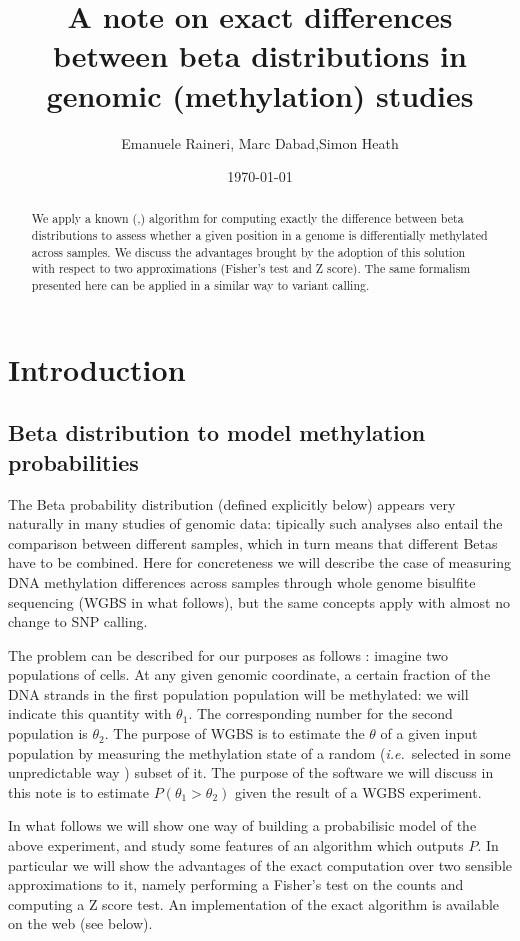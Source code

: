 \documentclass[11pt]{amsart}
\title{A note on exact differences between beta distributions in genomic (methylation) studies}
\author{Emanuele Raineri, Marc Dabad,Simon Heath}
\date{\today}
\newcommand{\ie}{\textit{i.e.}\ }
\begin{document}
\begin{abstract}
We apply a known (\cite{exactbetaineq},\cite{numineq}) algorithm for computing exactly the difference between beta distributions
to assess whether a given position in a genome is differentially methylated across
samples. We discuss the advantages brought by the adoption of this solution
with respect to two approximations (Fisher's test and Z score).
The same formalism presented here can be applied in a similar way to variant calling.
\end{abstract}
\maketitle
\section{Introduction}
\subsection{Beta distribution to model methylation probabilities}
The Beta probability distribution (defined explicitly below) appears very naturally in many studies of genomic data: tipically such analyses also entail the comparison between different samples, which in turn means that different Betas have to be combined. Here for concreteness we will describe the case of measuring DNA methylation differences across samples through whole genome bisulfite sequencing (WGBS in what follows), but the same concepts  apply with almost no change to SNP calling. 

The problem can be described for our purposes as follows : imagine two populations of cells. At any given genomic coordinate, a certain fraction of the DNA strands in the first population population will be methylated: we will indicate this quantity with $\theta_1$. The corresponding number for the second population is $\theta_2$. The purpose of WGBS is to estimate the $\theta$ of a given input population by measuring the methylation state of a random (\ie selected in some unpredictable way )  subset of it. The purpose of the software we will discuss in this note is to estimate $P(\theta_1>\theta_2)$ given the result of a WGBS experiment.

In what follows we will show one way of building a probabilisic model of the above experiment, and study some features of an algorithm which outputs $P$. In particular we will show the advantages of the exact computation over two sensible approximations to it, namely performing a Fisher's test on the counts and computing a Z score test. An implementation of the exact algorithm is available on the web (see below).
\end{document}
